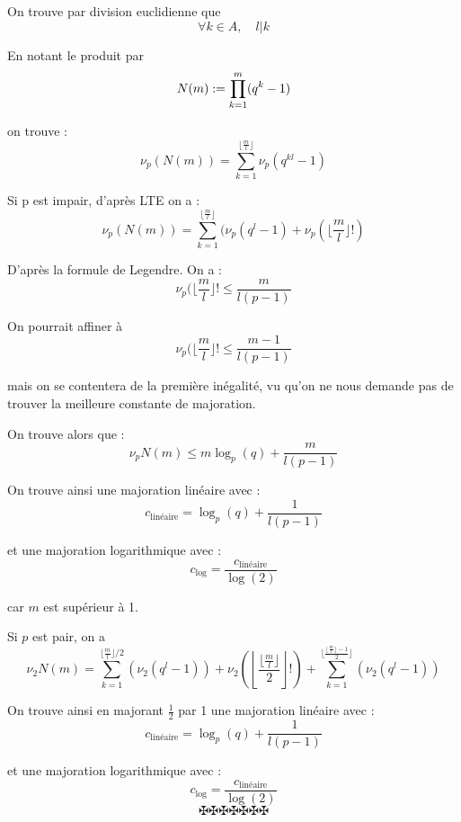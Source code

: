 On trouve par division euclidienne que
\[ \forall k \in A, \quad l|k \]


En notant le produit par
\[ N (m) := \underset{k = 1}{\overset{m}{\prod}} (q^k - 1) \]


on trouve :
\[ \nu_p  (N (m)) = \sum_{k = 1}^{\lfloor \frac{m}{l} \rfloor} \nu_p  (q^{kl}
   - 1) \]


Si p est impair, d'apr{\`e}s LTE on a :
\[ \nu_p  (N (m)) = \sum_{k = 1}^{\lfloor \frac{m}{l} \rfloor} (\nu_p  (q^l -
   1) + \nu_p (\lfloor \frac{m}{l} \rfloor !) \]


D'apr{\`e}s la formule de Legendre. On a :
\[ \nu_p (\lfloor \frac{m}{l} \rfloor ! \leq \frac{m}{l (p - 1)} \]


On pourrait affiner {\`a}
\[ \nu_p (\lfloor \frac{m}{l} \rfloor ! \leq \frac{m - 1}{l (p - 1)} \]


mais on se contentera de la premi{\`e}re in{\'e}galit{\'e}, vu qu'on ne nous
demande pas de trouver la meilleure constante de majoration.

On trouve alors que :
\[ \nu_p N (m) \leq m \log_p (q) + \frac{m}{l (p - 1)} \]


On trouve ainsi une majoration lin{\'e}aire avec :
\[ c_{\text{lin{\'e}aire}} = \log_p (q) + \frac{1}{l (p - 1)} \]


et une majoration logarithmique avec :
\[ c_{\log} = \frac{c_{\text{lin{\'e}aire}}}{\log (2)} \]


car $m$ est sup{\'e}rieur {\`a} 1.

Si $p$ est pair, on a
\[ \nu_2 N (m) = \sum_{k = 1}^{\lfloor \frac{m}{l} \rfloor / 2} (\nu_2 (q^l -
   1)) + \nu_2 \left( \left\lfloor \frac{\lfloor \frac{m}{l} \rfloor}{2}
   \right\rfloor ! \right) + \sum_{k = 1}^{\lfloor \frac{\lfloor \frac{m}{l}
   \rfloor - 1}{2} \rfloor} (\nu_2 (q^l - 1)) \]


On trouve ainsi en majorant $\frac{1}{2}$ par 1 une majoration lin{\'e}aire
avec :
\[ c_{\text{lin{\'e}aire}} = \log_p (q) + \frac{1}{l (p - 1)} \]


et une majoration logarithmique avec :
\[ c_{\log} = \frac{c_{\text{lin{\'e}aire}}}{\log (2)} \]
\[ \maltese \maltese \maltese \maltese \maltese \maltese \maltese \]
